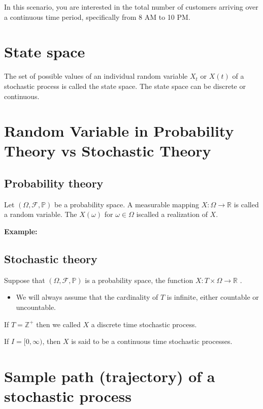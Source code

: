 \documentclass[
  letterpaper,
  DIV=11,
  numbers=noendperiod]{scrreprt}
\providecommand{\tightlist}{%
  \setlength{\itemsep}{0pt}\setlength{\parskip}{0pt}}\usepackage{longtable,booktabs,array}
\begin{document}
In this scenario, you are interested in the total number of customers
arriving over a continuous time period, specifically from 8 AM to 10 PM.

\section{State space}\label{state-space}

The set of possible values of an individual random variable \(X_t\) or
\(X(t)\) of a stochastic process is called the state space. The state
space can be discrete or continuous.

\section{Random Variable in Probability Theory vs Stochastic
Theory}\label{random-variable-in-probability-theory-vs-stochastic-theory}

\subsection{Probability theory}\label{probability-theory}

Let \((\Omega, \mathscr{F}, \mathbb{P})\) be a probability space. A
measurable mapping \(X: \Omega \rightarrow \mathbb{R}\) is called a
random variable. The \(X(\omega)\) for \(\omega \in \Omega\) iscalled a
realization of \(X\).

\textbf{Example:}

\subsection{Stochastic theory}\label{stochastic-theory}

Suppose that \((\Omega, \mathscr{F}, \mathbb{P})\) is a probability
space, the function \(X: T \times \Omega \rightarrow \mathbb{R}\) .

\begin{itemize}
\tightlist
\item
  We will always assume that the cardinality of \(T\) is infinite,
  either countable or uncountable.
\end{itemize}

If \(T=\mathbb{Z}^+\) then we called \(X\) a discrete time stochastic
process.

If \(I = [0,\infty)\), then \(X\) is said to be a continuous time
stochastic processes.

\section{Sample path (trajectory) of a stochastic
process}\label{sample-path-trajectory-of-a-stochastic-process}
\end{document}
